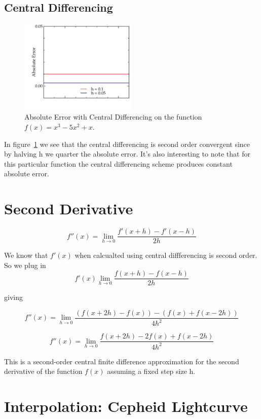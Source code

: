 \documentclass[11pt,letterpaper]{article}
\begin{document}
\subsection{Central Differencing}


\begin{figure}[bth]
\centering
\includegraphics[width=0.5\textwidth]{central_difference.pdf}
\caption{Absolute Error with Central Differencing on the function $f(x) = 
x^3 -5x^2+x$.}
\label{fig:central_difference}
\end{figure}

In figure~\ref{fig:central_difference} we see that the central differencing is
second order convergent since by halving h we quarter the absolute error. It's 
also interesting to note that for this particular function the central
differencing scheme produces constant absolute error.

\section{Second Derivative}

$$f''(x) = \lim_{h \to 0}\frac{f'(x+h) - f'(x-h)}{2h}$$

We know that $f'(x)$ when calcualted using central diffferencing is second
order. So we plug in 
$$f'(x) \lim_{h \to 0} \frac{f(x+h) - f(x-h)}{2h}$$ 

giving

$$f''(x) = \lim_{h \to 0}
    \frac{\left(f(x+2h) - f(x)\right) - \left( f(x) + f(x-2h)\right)}{4h^2}$$

$$f''(x) = \lim_{h \to 0}\frac{f(x+2h) - 2f(x) + f(x-2h)}{4h^2}$$

This is a second-order central finite difference approximation for the second
derivative of the function $f(x)$ assuming a fixed step size h.

\section{Interpolation: Cepheid Lightcurve}
\end{document}
